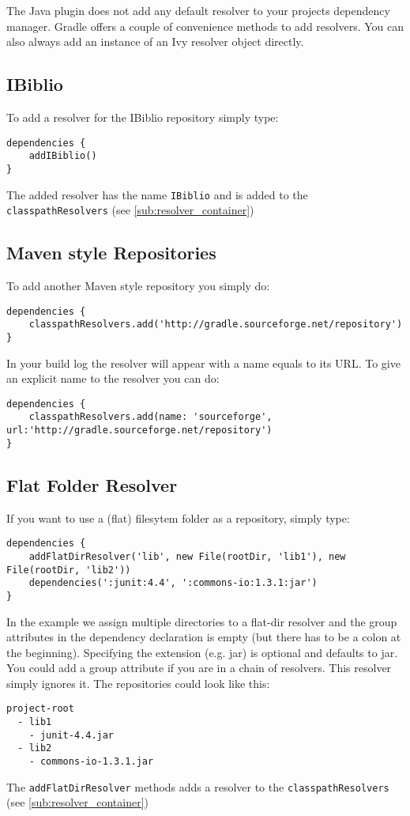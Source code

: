 The Java plugin does not add any default resolver to your projects dependency manager. Gradle offers a couple of convenience methods to add resolvers. You can also always add an instance of an Ivy resolver object directly.

\subsection{IBiblio} %
\label{sub:ibiblio}
To add a resolver for the IBiblio repository simply type:
\begin{Verbatim}
dependencies {
	addIBiblio()
}
\end{Verbatim}
The added resolver has the name \texttt{IBiblio} and is added to the \texttt{classpathResolvers} (see  \ref{sub:resolver_container})

\subsection{Maven style Repositories} %
\label{sub:maven_style_repositories}
To add another Maven style repository you simply do: 
\begin{Verbatim}
dependencies {
	classpathResolvers.add('http://gradle.sourceforge.net/repository')
}
\end{Verbatim}
In your build log the resolver will appear with a name equals to its URL. To give an explicit name to the resolver you can do:
\begin{Verbatim}
dependencies {
	classpathResolvers.add(name: 'sourceforge', url:'http://gradle.sourceforge.net/repository')
}
\end{Verbatim}  

\subsection{Flat Folder Resolver} %
\label{sub:flat_folder_resolver}
If you want to use a (flat) filesytem folder as a repository, simply type:
\begin{Verbatim}
dependencies {
	addFlatDirResolver('lib', new File(rootDir, 'lib1'), new File(rootDir, 'lib2'))
	dependencies(':junit:4.4', ':commons-io:1.3.1:jar')
}
\end{Verbatim}
In the example we assign multiple directories to a flat-dir resolver and the group attributes in the dependency declaration is empty (but there has to be a colon at the beginning). Specifying the extension (e.g. jar) is optional and defaults to jar. You could add a group attribute if you are in a chain of resolvers. This resolver simply ignores it. The repositories could look like this:
\begin{Verbatim}
project-root
  - lib1
    - junit-4.4.jar
  - lib2
    - commons-io-1.3.1.jar	
\end{Verbatim}
The \texttt{addFlatDirResolver} methods adds a resolver to the \texttt{classpathResolvers} (see  \ref{sub:resolver_container})

